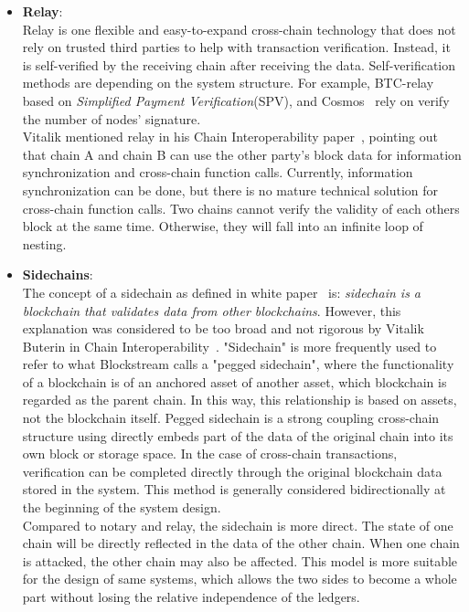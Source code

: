 \begin{itemize}
    \item \textbf{Relay\cite{buterin2016chain}}:\\
    Relay is one flexible and easy-to-expand cross-chain technology that does not rely on trusted third parties to help with transaction verification. Instead, it is self-verified by the receiving chain after receiving the data. Self-verification methods are depending on the system structure. For example, BTC-relay\cite{btc-relay} based on \textit{Simplified Payment Verification}(SPV), and Cosmos~\cite{cosmos} rely on verify the number of nodes' signature.\\
    
    Vitalik mentioned relay in his Chain Interoperability paper~\cite{buterin2016chain}, pointing out that chain A and chain B can use the other party's block data for information synchronization and cross-chain function calls. Currently, information synchronization can be done, but there is no mature technical solution for cross-chain function calls. Two chains cannot verify the validity of each others block at the same time. Otherwise, they will fall into an infinite loop of nesting. 
    
    
    
    \item \textbf{Sidechains}:\\
     The concept of a sidechain as defined in white paper~\cite{back2014enabling} is: \textit{sidechain is a blockchain that validates data from other blockchains}. However, this explanation was considered to be too broad and not rigorous by Vitalik Buterin in Chain Interoperability~\cite{buterin2016chain}. "Sidechain" is more frequently used to refer to what Blockstream calls a "pegged sidechain", where the functionality of a blockchain is of an anchored asset of another asset, which blockchain is regarded as the parent chain. In this way, this relationship is based on assets, not the blockchain itself. Pegged sidechain is a strong coupling cross-chain structure using directly embeds part of the data of the original chain into its own block or storage space. In the case of cross-chain transactions,  verification can be completed directly through the original blockchain data stored in the system. This method is generally considered bidirectionally at the beginning of the system design.\\
     
     Compared to notary and relay, the sidechain is more direct. The state of one chain will be directly reflected in the data of the other chain. When one chain is attacked, the other chain may also be affected. This model is more suitable for the design of same systems, which allows the two sides to become a whole part without losing the relative independence of the ledgers.

\end{itemize}
